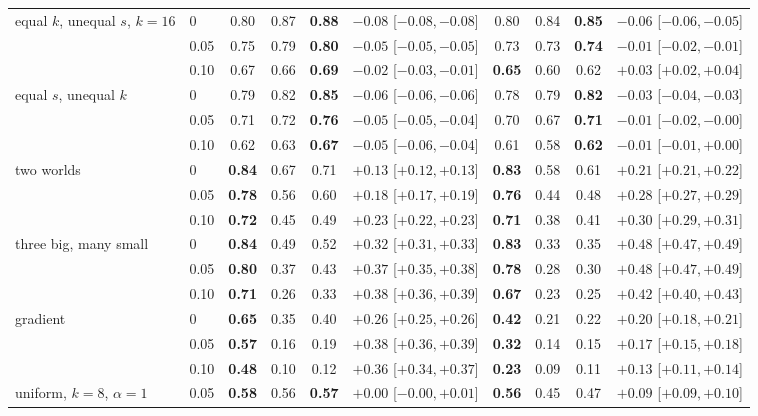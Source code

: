 \begin{table}[p]
\begin{ruledtabular}
\begin{tabular}{llccc c|ccc c}
equal $k$, unequal $s$, $k{=}16$ & 0 & 0.80 & 0.87 & \textbf{0.88} & $-0.08$ [$-0.08,-0.08$] & 0.80 & 0.84 & \textbf{0.85} & $-0.06$ [$-0.06,-0.05$] \\
 & 0.05 & 0.75 & 0.79 & \textbf{0.80} & $-0.05$ [$-0.05,-0.05$] & 0.73 & 0.73 & \textbf{0.74} & $-0.01$ [$-0.02,-0.01$] \\
 & 0.10 & 0.67 & 0.66 & \textbf{0.69} & $-0.02$ [$-0.03,-0.01$] & \textbf{0.65} & 0.60 & 0.62 & $+0.03$ [$+0.02,+0.04$] \\
equal $s$, unequal $k$ & 0 & 0.79 & 0.82 & \textbf{0.85} & $-0.06$ [$-0.06,-0.06$] & 0.78 & 0.79 & \textbf{0.82} & $-0.03$ [$-0.04,-0.03$] \\
 & 0.05 & 0.71 & 0.72 & \textbf{0.76} & $-0.05$ [$-0.05,-0.04$] & 0.70 & 0.67 & \textbf{0.71} & $-0.01$ [$-0.02,-0.00$] \\
 & 0.10 & 0.62 & 0.63 & \textbf{0.67} & $-0.05$ [$-0.06,-0.04$] & 0.61 & 0.58 & \textbf{0.62} & $-0.01$ [$-0.01,+0.00$] \\
two worlds & 0 & \textbf{0.84} & 0.67 & 0.71 & $+0.13$ [$+0.12,+0.13$] & \textbf{0.83} & 0.58 & 0.61 & $+0.21$ [$+0.21,+0.22$] \\
 & 0.05 & \textbf{0.78} & 0.56 & 0.60 & $+0.18$ [$+0.17,+0.19$] & \textbf{0.76} & 0.44 & 0.48 & $+0.28$ [$+0.27,+0.29$] \\
 & 0.10 & \textbf{0.72} & 0.45 & 0.49 & $+0.23$ [$+0.22,+0.23$] & \textbf{0.71} & 0.38 & 0.41 & $+0.30$ [$+0.29,+0.31$] \\
three big, many small & 0 & \textbf{0.84} & 0.49 & 0.52 & $+0.32$ [$+0.31,+0.33$] & \textbf{0.83} & 0.33 & 0.35 & $+0.48$ [$+0.47,+0.49$] \\
 & 0.05 & \textbf{0.80} & 0.37 & 0.43 & $+0.37$ [$+0.35,+0.38$] & \textbf{0.78} & 0.28 & 0.30 & $+0.48$ [$+0.47,+0.49$] \\
 & 0.10 & \textbf{0.71} & 0.26 & 0.33 & $+0.38$ [$+0.36,+0.39$] & \textbf{0.67} & 0.23 & 0.25 & $+0.42$ [$+0.40,+0.43$] \\
gradient & 0 & \textbf{0.65} & 0.35 & 0.40 & $+0.26$ [$+0.25,+0.26$] & \textbf{0.42} & 0.21 & 0.22 & $+0.20$ [$+0.18,+0.21$] \\
 & 0.05 & \textbf{0.57} & 0.16 & 0.19 & $+0.38$ [$+0.36,+0.39$] & \textbf{0.32} & 0.14 & 0.15 & $+0.17$ [$+0.15,+0.18$] \\
 & 0.10 & \textbf{0.48} & 0.10 & 0.12 & $+0.36$ [$+0.34,+0.37$] & \textbf{0.23} & 0.09 & 0.11 & $+0.13$ [$+0.11,+0.14$] \\
uniform, $k{=}8$, $\alpha{=}1$ & 0.05 & \textbf{0.58} & 0.56 & \textbf{0.57} & $+0.00$ [$-0.00,+0.01$] & \textbf{0.56} & 0.45 & 0.47 & $+0.09$ [$+0.09,+0.10$] \\

\end{tabular}
\end{ruledtabular}
\end{table}
